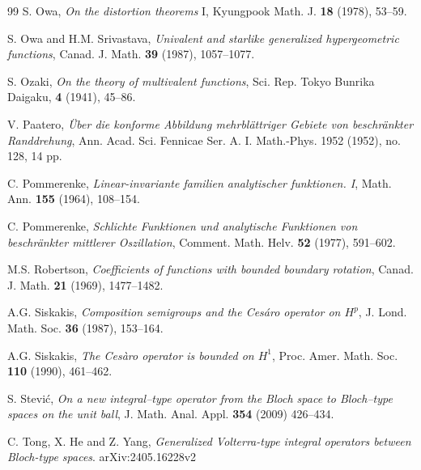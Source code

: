 \documentclass[12pt,a4paper]{amsart}
\numberwithin{equation}{section}
\theoremstyle{remark}
\begin{document}
\begin{thebibliography}{99}
 S. Owa, \textit{On the distortion theorems} I, Kyungpook Math. J. {\bf18} (1978), 53--59.

 S. Owa and H.M. Srivastava, \textit{Univalent and starlike generalized hypergeometric functions}, Canad. J. Math. {\bf39} (1987), 1057--1077.

 S. Ozaki, \textit{On the theory of multivalent functions}, Sci. Rep. Tokyo Bunrika Daigaku, {\bf4} (1941), 45--86.

 V. Paatero, \textit{\"{U}ber die konforme Abbildung mehrbl\"attriger Gebiete von beschr\"ankter Randdrehung}, Ann. Acad. Sci. Fennicae Ser. A. I. Math.-Phys. 1952 (1952), no. 128, 14 pp.

 C. Pommerenke, \textit{Linear-invariante familien analytischer funktionen. I}, Math. Ann. {\bf 155} (1964), 108--154.

 C. Pommerenke, \textit{Schlichte Funktionen und analytische Funktionen von beschr\"{a}nkter mittlerer Oszillation}, Comment. Math. Helv. {\bf52} (1977), 591--602.

 M.S. Robertson, \textit{Coefficients of functions with bounded boundary rotation}, Canad. J. Math. {\bf21} (1969), 1477--1482.

 A.G. Siskakis, \textit{Composition semigroups and the Ces\'{a}ro operator on $H^p$}, J. Lond. Math. Soc. {\bf36} (1987), 153--164.

 A.G. Siskakis, \textit{The Ces\`{a}ro operator is bounded on $H^1$}, Proc. Amer. Math. Soc. {\bf110} (1990), 461--462.

 S. Stevi\'{c}, \textit{On a new integral--type operator from the Bloch space to Bloch--type spaces on the unit ball}, J. Math. Anal. Appl. {\bf354} (2009) 426--434.

C. Tong, X. He and Z. Yang, \textit{Generalized Volterra-type integral operators between Bloch-type spaces}. arXiv:2405.16228v2 

\end{thebibliography}
\end{document}
